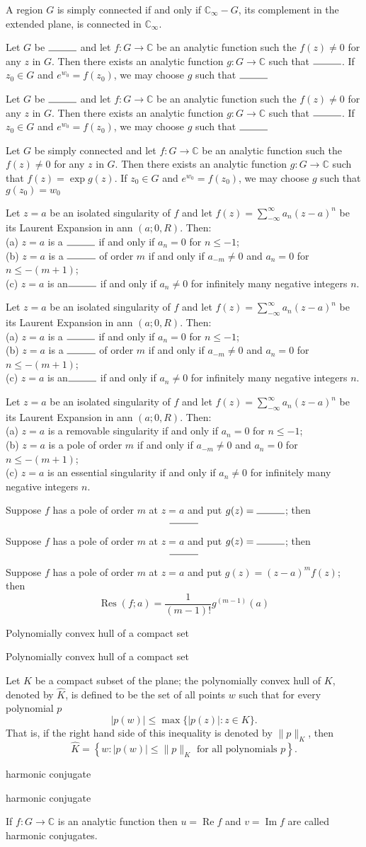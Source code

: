 \documentclass[17pt]{extarticle}
\newcommand{\boxset}[2]{\begin{mdframed}[style=darkQuesion]
#1
\end{mdframed}
\newpage
\begin{mdframed}[style=darkQuesion]
  #1
    \end{mdframed}
\begin{mdframed}[style=darkAnswer]
  #2
    \end{mdframed}
    \newpage
}
\begin{document}
{A region $G$ is simply connected if and only if $\mathbb{C}_{\infty}-G$, its complement in the extended plane, is connected in $\mathbb{C}_{\infty}$.}
\boxset{   Let $G$ be $\rule{1cm}{0.15mm}$ and let $f: G \rightarrow \mathbb{C}$ be an analytic function such the $f(z) \neq 0$ for any $z$ in $G$. Then there exists an analytic function $g: G \rightarrow \mathbb{C}$ such that $\rule{1cm}{0.15mm}$. If $z_{0} \in G$ and $e^{w_{0}}=f\left(z_{0}\right)$, we may choose $g$ such that $\rule{1cm}{0.15mm}$  }
{   Let $G$ be simply connected and let $f: G \rightarrow \mathbb{C}$ be an analytic function such the $f(z) \neq 0$ for any $z$ in $G$. Then there exists an analytic function $g: G \rightarrow \mathbb{C}$ such that $f(z)=\exp g(z)$. If $z_{0} \in G$ and $e^{w_{0}}=f\left(z_{0}\right)$, we may choose $g$ such that $g\left(z_{0}\right)=w_{0}$ }
\boxset{Let $z=a$ be an isolated singularity of $f$ and let $f(z)=\sum_{-\infty}^{\infty} a_{n}(z-a)^{n}$ be its Laurent Expansion in ann $(a ; 0, R)$. Then:\[\ \] (a) $z=a$ is a $\rule{1cm}{0.15mm}$ if and only if $a_{n}=0$ for $n \leq-1$;\[\ \] (b) $z=a$ is a $\rule{1cm}{0.15mm}$ of order $m$ if and only if $a_{-m} \neq 0$ and $a_{n}=0$ for $n \leq-(m+1)$;\[\ \] (c) $z=a$ is an$\rule{1cm}{0.15mm}$ if and only if $a_{n} \neq 0$ for infinitely many negative integers $n$. }
{Let $z=a$ be an isolated singularity of $f$ and let $f(z)=\sum_{-\infty}^{\infty} a_{n}(z-a)^{n}$ be its Laurent Expansion in ann $(a ; 0, R)$. Then:\[\ \] (a) $z=a$ is a removable singularity if and only if $a_{n}=0$ for $n \leq-1$;\[\ \] (b) $z=a$ is a pole of order $m$ if and only if $a_{-m} \neq 0$ and $a_{n}=0$ for $n \leq-(m+1)$;\[\ \] (c) $z=a$ is an essential singularity if and only if $a_{n} \neq 0$ for infinitely many negative integers $n$.}
\boxset{Suppose $f$ has a pole of order $m$ at $z=a$ and put $g(z)=\rule{1cm}{0.15mm}$; then \[\rule{1cm}{0.15mm}\] }
{   Suppose $f$ has a pole of order $m$ at $z=a$ and put $g(z)=(z-a)^{m} f(z)$; then \[\operatorname{Res}(f ; a)=\frac{1}{(m-1) !} g^{(m-1)}(a)\] }
\boxset{Polynomially convex hull of a compact set}
{Let $K$ be a compact subset of the plane; the polynomially convex hull of $K$, denoted by $\hat{K}$, is defined to be the set of all points $w$ such that for every polynomial $p$\[|p(w)| \leq \max \{|p(z)|: z \in K\} .\] That is, if the right hand side of this inequality is denoted by $\|p\|_{K}$, then \[\hat{K}=\left\{w:|p(w)| \leq\|p\|_{K} \text { for all polynomials } p\right\} .\]}
\boxset{harmonic conjugate}
{If $f: G \rightarrow \mathbb{C}$ is an analytic function then $u=\operatorname{Re} f$ and $v=\operatorname{Im} f$ are called harmonic conjugates.}
\end{document}

